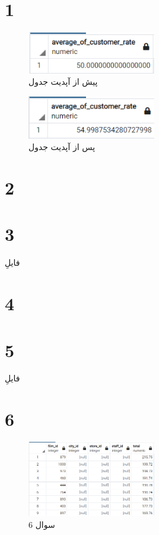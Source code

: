 \documentclass{article}
\begin{document}


\newpage


\section{1}
\begin{figure}[H]
    \centering
    \includegraphics[width=0.5\textwidth]{figures/1.c.1.png}
    \caption
	{
پیش از آپدیت جدول 
	}
    \label{fig:fig1}
\end{figure}
\begin{figure}[H]
    \centering
    \includegraphics[width=0.5\textwidth]{figures/1.c.2.png}
    \caption
	{
پس از آپدیت جدول 
	}
    \label{fig:fig1}
\end{figure}


\section{2}

\section{3}
فایلِ 
\section{4}

\section{5}
فایلِ 
\section{6}
\begin{figure}[H]
    \centering
    \includegraphics[width=0.5\textwidth]{figures/6.png}
    \caption
	{
سوال 6
	}
    \label{fig:fig1}
\end{figure}
\end{document}
